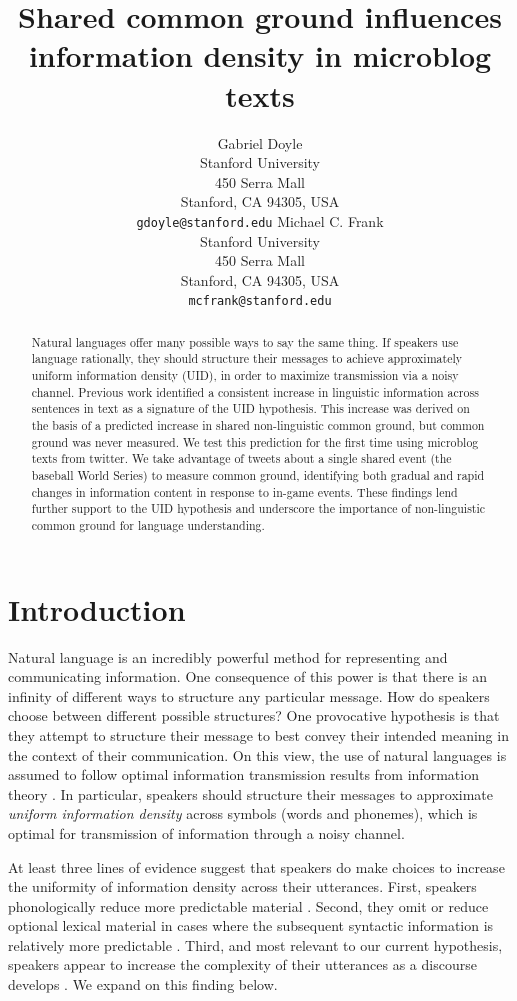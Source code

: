 \documentclass[11pt,letterpaper]{article}
\title{Shared common ground influences information density in microblog texts\Thanks{Thanks to...}}
\author{Gabriel Doyle\\
	    Stanford University\\
	    450 Serra Mall\\
	    Stanford, CA 94305, USA\\
	    {\tt gdoyle@stanford.edu}
	  \And
          Michael C. Frank\\
	    Stanford University\\
	    450 Serra Mall\\
	    Stanford, CA 94305, USA\\
	    {\tt mcfrank@stanford.edu}}
\date{}
\begin{document}
\maketitle
\begin{abstract}
Natural languages offer many possible ways to say the same thing. If speakers use language rationally, they should structure their messages to achieve approximately uniform information density (UID), in order to maximize transmission via a noisy channel. Previous work identified a consistent increase in linguistic information across sentences in text as a signature of the UID hypothesis. This increase was derived on the basis of a predicted increase in shared non-linguistic common ground, but common ground was never measured. We test this prediction for the first time using microblog texts from twitter. We take advantage of tweets about a single shared event (the baseball World Series) to measure common ground, identifying both gradual and rapid changes in information content in response to in-game events. These findings lend further support to the UID hypothesis and underscore the importance of non-linguistic common ground for language understanding.
\end{abstract}

\section{Introduction}

Natural language is an incredibly powerful method for representing and communicating information. One consequence of this power is that there is an infinity of different ways to structure any particular message. How do speakers choose between different possible structures? One provocative hypothesis is that they attempt to structure their message to best convey their intended meaning in the context of their communication. On this view, the use of natural languages is assumed to follow optimal information transmission results from information theory \cite{shannon1948}. In particular, speakers should structure their messages to approximate \emph{uniform information density} across symbols (words and phonemes), which is optimal for transmission of information through a noisy channel. 

At least three lines of evidence suggest that speakers do make choices to increase the uniformity of information density across their utterances. First, speakers phonologically reduce more predictable material \cite{aylett2004,aylett2006,bell2003}. Second, they omit or reduce optional lexical material in cases where the subsequent syntactic information is relatively more predictable \cite{levy2007,frank2008,jaeger2010}. Third, and most relevant to our current hypothesis, speakers appear to increase the complexity of their utterances as a discourse develops \cite{genzel2002,genzel2003,qian2012}. We expand on this finding below.
\end{document}

